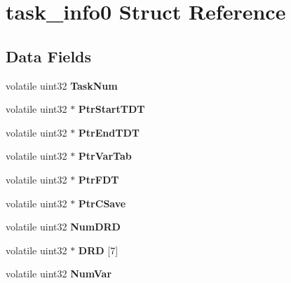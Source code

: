 \hypertarget{structtask__info0}{}\section{task\+\_\+info0 Struct Reference}
\label{structtask__info0}
\subsection*{Data Fields}
\begin{DoxyCompactItemize}
\item 
\mbox{\label{structtask__info0_ada602dcff1b9683c3e7f0dca3bca4e6b}} 
volatile uint32 {\bfseries Task\+Num}
\item 
\mbox{\label{structtask__info0_a7693b92b4374c1e673ac9919dfa5e23b}} 
volatile uint32 $\ast$ {\bfseries Ptr\+Start\+T\+DT}
\item 
\mbox{\label{structtask__info0_adde0e4a4d5b9f8aae620ac94155ba02a}} 
volatile uint32 $\ast$ {\bfseries Ptr\+End\+T\+DT}
\item 
\mbox{\label{structtask__info0_a7ff6d17963ad429013a72197016b64d4}} 
volatile uint32 $\ast$ {\bfseries Ptr\+Var\+Tab}
\item 
\mbox{\label{structtask__info0_ab3727bb5236440c1171636cb7c39193d}} 
volatile uint32 $\ast$ {\bfseries Ptr\+F\+DT}
\item 
\mbox{\label{structtask__info0_a0082a8158fe037735ed3dd53d27b4857}} 
volatile uint32 $\ast$ {\bfseries Ptr\+C\+Save}
\item 
\mbox{\label{structtask__info0_a3e3c91a4740ee3d74004c6739fc9d5d1}} 
volatile uint32 {\bfseries Num\+D\+RD}
\item 
\mbox{\label{structtask__info0_ac748b2eda4b7896ea1ec902a72bfb919}} 
volatile uint32 $\ast$ {\bfseries D\+RD} \mbox{[}7\mbox{]}
\item 
\mbox{\label{structtask__info0_a9536c9f86e8d0c53dbf97a5be5f65a09}} 
volatile uint32 {\bfseries Num\+Var}
\item 

\end{DoxyCompactItemize}
